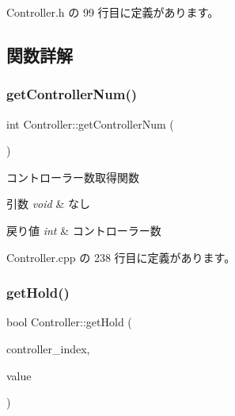  Controller.\+h の 99 行目に定義があります。



\subsection{関数詳解}
\mbox{\label{class_controller_a8bb801356986692b32f989574af8d669}} 
\subsubsection{\texorpdfstring{get\+Controller\+Num()}{getControllerNum()}}
{\footnotesize\ttfamily int Controller\+::get\+Controller\+Num (\begin{DoxyParamCaption}{ }\end{DoxyParamCaption})}



コントローラー数取得関数 


\begin{DoxyParams}{引数}
{\em void} & なし \\
\hline
\end{DoxyParams}

\begin{DoxyRetVals}{戻り値}
{\em int} & コントローラー数 \\
\hline
\end{DoxyRetVals}


 Controller.\+cpp の 238 行目に定義があります。

\mbox{\label{class_controller_a65e554b546455b9c1fdeb9e5d87731d0}} 
\subsubsection{\texorpdfstring{get\+Hold()}{getHold()}}
{\footnotesize\ttfamily bool Controller\+::get\+Hold (\begin{DoxyParamCaption}\item[{int}]{controller\+\_\+index,  }\item[{int}]{value }\end{DoxyParamCaption})}




